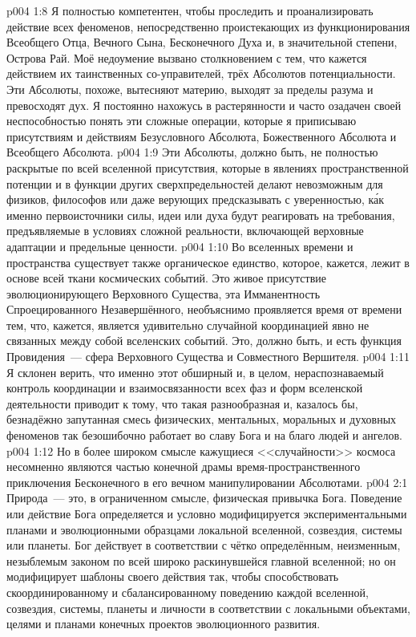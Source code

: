 \vs p004 1:8 Я полностью компетентен, чтобы проследить и проанализировать действие всех феноменов, непосредственно проистекающих из функционирования Всеобщего Отца, Вечного Сына, Бесконечного Духа и, в значительной степени, Острова Рай. Моё недоумение вызвано столкновением с тем, что кажется действием их таинственных со\hyp{}управителей, трёх Абсолютов потенциальности. Эти Абсолюты, похоже, вытесняют материю, выходят за пределы разума и превосходят дух. Я постоянно нахожусь в растерянности и часто озадачен своей неспособностью понять эти сложные операции, которые я приписываю присутствиям и действиям Безусловного Абсолюта, Божественного Абсолюта и Всеобщего Абсолюта.
\vs p004 1:9 Эти Абсолюты, должно быть, не полностью раскрытые по всей вселенной присутствия, которые в явлениях пространственной потенции и в функции других сверхпредельностей делают невозможным для физиков, философов или даже верующих предсказывать с уверенностью, к\'ак именно первоисточники силы, идеи или духа будут реагировать на требования, предъявляемые в условиях сложной реальности, включающей верховные адаптации и предельные ценности.
\vs p004 1:10 \pc Во вселенных времени и пространства существует также органическое единство, которое, кажется, лежит в основе всей ткани космических событий. Это живое присутствие эволюционирующего Верховного Существа, эта Имманентность Спроецированного Незавершённого, необъяснимо проявляется время от времени тем, что, кажется, является удивительно случайной координацией явно не связанных между собой вселенских событий. Это, должно быть, и есть функция Провидения~--- сфера Верховного Существа и Совместного Вершителя.
\vs p004 1:11 Я склонен верить, что именно этот обширный и, в целом, нераспознаваемый контроль координации и взаимосвязанности всех фаз и форм вселенской деятельности приводит к тому, что такая разнообразная и, казалось бы, безнадёжно запутанная смесь физических, ментальных, моральных и духовных феноменов так безошибочно работает во славу Бога и на благо людей и ангелов.
\vs p004 1:12 Но в более широком смысле кажущиеся <<случайности>> космоса несомненно являются частью конечной драмы время\hyp{}пространственного приключения Бесконечного в его вечном манипулировании Абсолютами.
\vs p004 2:1 Природа~--- это, в ограниченном смысле, физическая привычка Бога. Поведение или действие Бога определяется и условно модифицируется экспериментальными планами и эволюционными образцами локальной вселенной, созвездия, системы или планеты. Бог действует в соответствии с чётко определённым, неизменным, незыблемым законом по всей широко раскинувшейся главной вселенной; но он модифицирует шаблоны своего действия так, чтобы способствовать скоординированному и сбалансированному поведению каждой вселенной, созвездия, системы, планеты и личности в соответствии с локальными объектами, целями и планами конечных проектов эволюционного развития.
